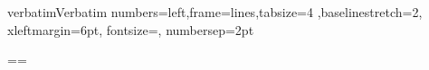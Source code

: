 
\usepackage{fancyvrb}
\DefineVerbatimEnvironment%
{verbatim}{Verbatim}
{numbers=left,frame=lines,tabsize=4 ,baselinestretch=2,
xleftmargin=6pt, fontsize=\footnotesize , numbersep=2pt}


\newlength{\fancyvrbtopsep}
\newlength{\fancyvrbpartopsep}
\makeatletter
\FV@AddToHook{\FV@ListParameterHook}
{\topsep=\fancyvrbtopsep\partopsep=\fancyvrbpartopsep}
\makeatother
\setlength{\fancyvrbtopsep}{-15pt}   %
\setlength{\fancyvrbpartopsep}{0pt}  %

